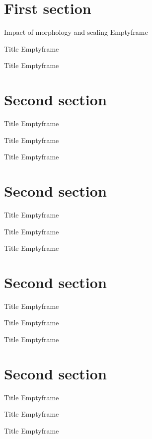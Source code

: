 \section{First section} 

\begin{frame}{Impact of morphology and scaling}
Emptyframe
\end{frame}

\begin{frame}{Title}
Emptyframe
\end{frame}

\begin{frame}{Title}
Emptyframe
\end{frame}

\section{Second section}

\begin{frame}{Title}
Emptyframe
\end{frame}

\begin{frame}{Title}
Emptyframe
\end{frame}

\begin{frame}{Title}
Emptyframe
\end{frame}

\section{Second section}

\begin{frame}{Title}
Emptyframe
\end{frame}

\begin{frame}{Title}
Emptyframe
\end{frame}

\begin{frame}{Title}
Emptyframe
\end{frame}

\section{Second section}

\begin{frame}{Title}
Emptyframe
\end{frame}

\begin{frame}{Title}
Emptyframe
\end{frame}

\begin{frame}{Title}
Emptyframe
\end{frame}

\section{Second section}

\begin{frame}{Title}
Emptyframe
\end{frame}

\begin{frame}{Title}
Emptyframe
\end{frame}

\begin{frame}{Title}
Emptyframe
\end{frame}

